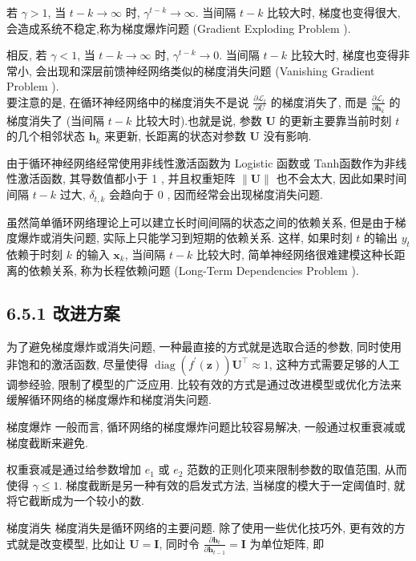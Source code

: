 \documentclass[10pt]{article}
\begin{document}
若 $\gamma>1$, 当 $t-k \rightarrow \infty$ 时, $\gamma^{t-k} \rightarrow \infty$. 当间隔 $t-k$ 比较大时, 梯度也变得很大,会造成系统不稳定,称为梯度爆炸问题 (Gradient Exploding Problem ).

相反, 若 $\gamma<1$, 当 $t-k \rightarrow \infty$ 时, $\gamma^{t-k} \rightarrow 0$. 当间隔 $t-k$ 比较大时, 梯度也变得非常小, 会出现和深层前馈神经网络类似的梯度消失问题 (Vanishing Gradient Problem ).\\
要注意的是, 在循环神经网络中的梯度消失不是说 $\frac{\partial \mathcal{L}_{t}}{\partial U}$ 的梯度消失了, 而是 $\frac{\partial \mathcal{L}_{t}}{\partial \boldsymbol{h}_{k}}$ 的梯度消失了 (当间隔 $t-k$ 比较大时).也就是说, 参数 $\boldsymbol{U}$ 的更新主要靠当前时刻 $t$ 的几个相邻状态 $\boldsymbol{h}_{k}$ 来更新, 长距离的状态对参数 $\boldsymbol{U}$ 没有影响.

由于循环神经网络经常使用非线性激活函数为 Logistic 函数或 Tanh函数作为非线性激活函数, 其导数值都小于 1 , 并且权重矩阵 $\|\boldsymbol{U}\|$ 也不会太大, 因此如果时间间隔 $t-k$ 过大, $\delta_{t, k}$ 会趋向于 0 , 因而经常会出现梯度消失问题.

虽然简单循环网络理论上可以建立长时间间隔的状态之间的依赖关系, 但是由于梯度爆炸或消失问题, 实际上只能学习到短期的依赖关系. 这样, 如果时刻 $t$ 的输出 $y_{t}$ 依赖于时刻 $k$ 的输入 $\boldsymbol{x}_{k}$, 当间隔 $t-k$ 比较大时, 简单神经网络很难建模这种长距离的依赖关系, 称为长程依赖问题 (Long-Term Dependencies Problem ).

\subsection*{6.5.1 改进方案}
为了避免梯度爆炸或消失问题, 一种最直接的方式就是选取合适的参数, 同时使用非饱和的激活函数, 尽量使得 $\operatorname{diag}\left(f^{\prime}(\boldsymbol{z})\right) \boldsymbol{U}^{\top} \approx 1$, 这种方式需要足够的人工调参经验, 限制了模型的广泛应用. 比较有效的方式是通过改进模型或优化方法来缓解循环网络的梯度爆炸和梯度消失问题.

梯度爆炸 一般而言, 循环网络的梯度爆炸问题比较容易解决, 一般通过权重衰减或梯度截断来避免.

权重衰减是通过给参数增加 $e_{1}$ 或 $e_{2}$ 范数的正则化项来限制参数的取值范围, 从而使得 $\gamma \leq 1$. 梯度截断是另一种有效的启发式方法, 当梯度的模大于一定阈值时, 就将它截断成为一个较小的数.

梯度消失 梯度消失是循环网络的主要问题. 除了使用一些优化技巧外, 更有效的方式就是改变模型, 比如让 $\boldsymbol{U}=\boldsymbol{I}$, 同时令 $\frac{\partial \boldsymbol{h}_{t}}{\partial \boldsymbol{h}_{t-1}}=\boldsymbol{I}$ 为单位矩阵, 即
\end{document}
